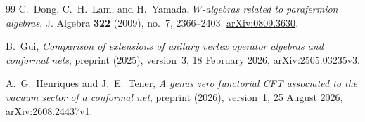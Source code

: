 \begin{thebibliography}{99}
C.~Dong, C.~H.~Lam, and H.~Yamada,
\emph{$W$-algebras related to parafermion algebras},
J. Algebra \textbf{322} (2009), no.~7, 2366--2403.
\href{https://arxiv.org/abs/0809.3630}{arXiv:0809.3630}.

B.~Gui,
\emph{Comparison of extensions of unitary vertex operator algebras
and conformal nets},
preprint (2025), version~3, 18 February 2026,
\href{https://arxiv.org/abs/2505.03235v3}{arXiv:2505.03235v3}.

A.~G.~Henriques and J.~E.~Tener,
\emph{A genus zero functorial CFT associated to the vacuum sector
of a conformal net},
preprint (2026), version~1, 25 August 2026,
\href{https://arxiv.org/abs/2608.24437v1}{arXiv:2608.24437v1}.

\end{thebibliography}

